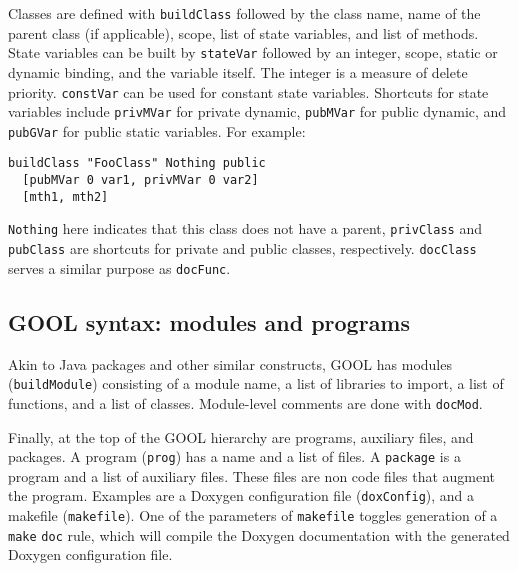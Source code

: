 \documentclass[sigplan,review,anonymous,prologue,dvipsnames]{acmart}
\begin{document}
Classes are defined with \verb|buildClass| followed by the class name, name of 
the parent class (if applicable), scope, list of state variables, and list of 
methods. State variables can be built by \verb|stateVar| followed by an 
integer, scope, static or dynamic binding, and the variable itself. The integer 
is a measure of delete priority. \verb|constVar| can be used for constant state 
variables. Shortcuts for state variables include \verb|privMVar| for private 
dynamic, \verb|pubMVar| for public dynamic, and \verb|pubGVar| for public 
static variables. For example:
\begin{lstlisting}
buildClass "FooClass" Nothing public 
  [pubMVar 0 var1, privMVar 0 var2] 
  [mth1, mth2]
\end{lstlisting}
\verb|Nothing| here indicates that this class does not have a parent,
\verb|privClass| and \verb|pubClass| are shortcuts for private and public
classes, respectively. \verb|docClass| serves a similar purpose as \verb|docFunc|.

\subsection{GOOL syntax: modules and programs}

Akin to Java packages and other similar constructs, GOOL has modules
(\verb|buildModule|) consisting of a module name, a list of libraries to import, 
a list of functions, and a list of classes. Module-level comments are done
with \verb|docMod|.

\begin{comment}
Passing a module to 
\verb|fileDoc| will put the finishing touches on the generated file, such as 
imports of standard libraries and preprocessor guards for C++ header files.
\begin{lstlisting}
fileDoc \$ buildModule "mod1" ["library1"] 
  [func1, func2] [class1, class2] 
\end{lstlisting}
\end{comment}

Finally, at the top of the GOOL hierarchy are programs, auxiliary files, and
packages. A program (\verb|prog|) has a name and a list of files.  A
\verb|package| is a program and a list of auxiliary files. These files are non
code files that augment the program. Examples are a Doxygen configuration file
(\verb|doxConfig|), and a makefile (\verb|makefile|).  One of the parameters of
\verb|makefile| toggles generation of a \verb|make| \verb|doc| rule, which will
compile the Doxygen documentation with the generated Doxygen configuration
file.
\end{document}

